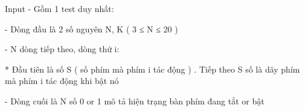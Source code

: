Input
- Gồm 1 test duy nhất:  

   - Dòng đầu là 2 số nguyên N, K ( 3 ≤ N ≤ 20 )  

   - N dòng tiếp theo, dòng thứ i:  

   * Đầu tiên là số S ( số phím mà phím i tác động ) . Tiếp theo S số là dãy phím mà phím i tác động khi bật nó  

   - Dòng cuối là N số 0 or 1 mô tả hiện trạng bàn phím đang tắt or bật